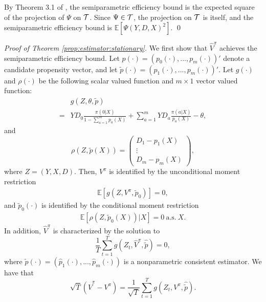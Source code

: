 \documentclass[letterpaper]{article} \usepackage{aaai19}  \usepackage{times}  \usepackage{helvet}  \usepackage{courier}  \usepackage{url}  \usepackage{graphicx}  \frenchspacing  \usepackage{comment}
\newcommand{\citet}[1]
{\citeauthor{#1} \shortcite{#1}}
\begin{document}
By Theorem 3.1 of \citet{Newey1990}, the semiparametric efficiency bound is the expected square of the projection of $\Psi$ on $\cal{T}$.
Since $\Psi\in \cal{T}$, the projection on $\cal{T}$ is itself, and the semiparametric efficiency bound is $\mathbb{E}[\Psi(Y,D,X)^2]$.
\qed
\par
\bigskip
\noindent
\noindent \textit{Proof of Theorem \ref{prop:estimator:stationary}.}
We first show that $\hat V^\pi$ achieves the semiparametric efficiency bound.
Let $p(\cdot)=(p_0(\cdot),...,p_m(\cdot))'$ denote a candidate propensity vector, and let $\tilde p(\cdot)=(p_1(\cdot),...,p_m(\cdot))'$.
Let $g(\cdot)$ and $\rho(\cdot)$ be the following scalar valued function and $m\times 1$ vector valued function:
\begin{align*}
	&g(Z,\theta,\tilde p)\\
	=&YD_{0}\frac{\pi(0|X)}{1-\sum_{a=1}^m p_{a}(X)}+\sum_{a=1}^m YD_{a}\frac{\pi(a|X)}{p_{a}(X)}-\theta,
\end{align*}
and
$$
\rho(Z,\tilde p(X))=\left(\begin{array}{c}
D_1-p_1(X)\\
\vdots \\
D_m-p_m(X)
\end{array}\right),
$$
where $Z=(Y,X,D)$.
Then, $V^{\pi}$ is identified by the unconditional moment restriction
\begin{align}\label{eq:moment_g}
	\mathbb{E}[g(Z,V^{\pi},\tilde p_0)]=0,
\end{align}
and $\tilde p_0(\cdot)$ is identified by the conditional moment restriction
\begin{align}\label{eq:moment_rho}
	\mathbb{E}[\rho(Z,\tilde p_0(X))|X]=0~\text{a.s.}~X.
\end{align}
In addition, $\hat V^{\pi}$ is characterized by the solution to
$$
\frac{1}{T}\sum_{t=1}^T g(Z_t,\hat V^{\pi},\hat {\tilde p})=0,
$$
where $\hat {\tilde p}(\cdot)=(\hat p_1(\cdot),...,\hat p_m(\cdot))$ is a nonparametric consistent estimator.
We have that
$$
\sqrt{T}(\hat V^{\pi}-V^{\pi})=\frac{1}{\sqrt{T}}\sum_{t=1}^T g(Z_t,V^{\pi},\hat {\tilde p}).
$$
\end{document}
